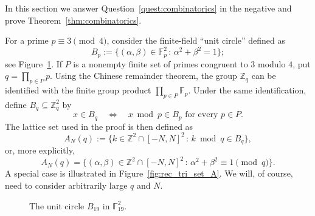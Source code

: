 \documentclass[11pt,reqno]{amsart}
\numberwithin{equation}{section}
\begin{document}
In this section we answer Question~\ref{quest:combinatorics} in the negative and prove Theorem~\ref{thm:combinatorics}.

For a prime $p\equiv3\pmod4$, consider the finite-field ``unit circle'' defined as
\begin{equation*}%
B_p:=\{(\alpha,\beta)\in\mathbb{F}_p^2 \,:\, \alpha^2+\beta^2=1\};
\end{equation*}
see Figure~\ref{fig:unit_circle}.
If $P$ is a nonempty finite set of primes congruent to $3$ modulo $4$, put $q=\prod_{p\in P}p$.
Using the Chinese remainder theorem, the group $\mathbb{Z}_q$ can be identified with the finite group product $\prod_{p\in P}\mathbb{F}_p$. Under the same identification, define $B_q\subseteq\mathbb{Z}_q^2$ by
\[ x\in B_q \quad\Longleftrightarrow\quad
x\bmod p\in B_p\text{ for every }p\in P. \]
The lattice set used in the proof is then defined as
\[ A_N(q) := \{k\in\mathbb{Z}^2\cap[-N,N]^2 \,:\, k\bmod q\in B_q\}, \]
or, more explicitly,
\[ A_N(q) = \{ (\alpha,\beta)\in\mathbb{Z}^2\cap[-N,N]^2 \,:\, \alpha^2+\beta^2 \equiv 1 \!\!\!\pmod q \}. \]
A special case is illustrated in Figure~\ref{fig:rec_tri_set_A}. We will, of course, need to consider arbitrarily large $q$ and $N$.

\begin{figure}
\begin{center}
\end{center}
\caption{The unit circle $B_{19}$ in $\mathbb{F}_{19}^2$.}
\label{fig:unit_circle}
\end{figure}
\end{document}
